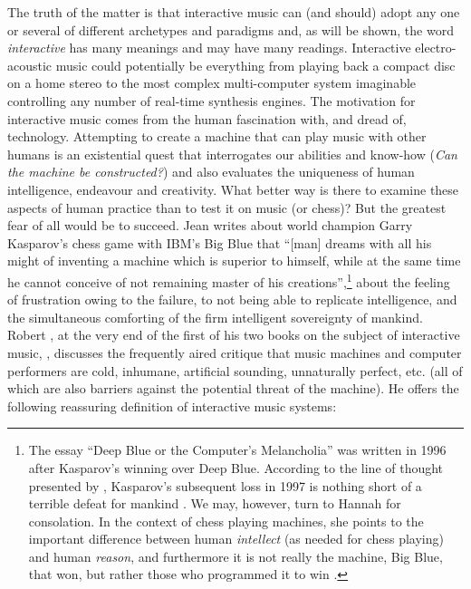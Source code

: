 The truth of the matter is that interactive music can (and should) adopt any one or several of different archetypes and paradigms and, as will be shown, the word \emph{interactive} has many meanings and may have many readings. Interactive electro-acoustic music could potentially be everything from playing back a compact disc on a home stereo to the most complex multi-computer system imaginable controlling any number of real-time synthesis engines. The motivation for interactive music comes from the human fascination with, and dread of, technology. Attempting to create a machine that can play music with other humans is an existential quest that interrogates our abilities and know-how (\emph{Can the machine be constructed?}) and also evaluates the uniqueness of human intelligence, endeavour and creativity. What better way is there to examine these aspects of human practice than to test it on music (or chess)? But the greatest fear of all would be to succeed. Jean \citeauthor{baudrillard02} writes about world champion Garry Kasparov's chess game with IBM's Big Blue that ``[man] dreams with all his might of inventing a machine which is superior to himself, while at the same time he cannot conceive of not remaining master of his creations'',\footnote{The essay ``Deep Blue or the Computer's Melancholia'' was written in 1996 after Kasparov's winning over Deep Blue. According to the line of thought presented by \citeauthor{baudrillard02}, Kasparov's subsequent loss in 1997 is nothing short of a terrible defeat for mankind \parencites[160-1]{baudrillard02}. We may, however, turn to Hannah \citeauthor{arendt77} for consolation. In the context of chess playing machines, she points to the important difference between human \emph{intellect} (as needed for chess playing) and human \emph{reason}, and furthermore it is not really the machine, Big Blue, that won, but rather those who programmed it to win \parencite[269]{arendt77}.} about the feeling of frustration owing to the failure, to not being able to replicate intelligence, and the simultaneous comforting of the firm intelligent sovereignty of mankind. Robert \citeauthor{rowe}, at the very end of the first of his two books on the subject of interactive music, , discusses the frequently aired critique that music machines and computer performers are cold, inhumane, artificial sounding, unnaturally perfect, etc. (all of which are also barriers against the potential threat of the machine). He offers the following reassuring definition of interactive music systems:

